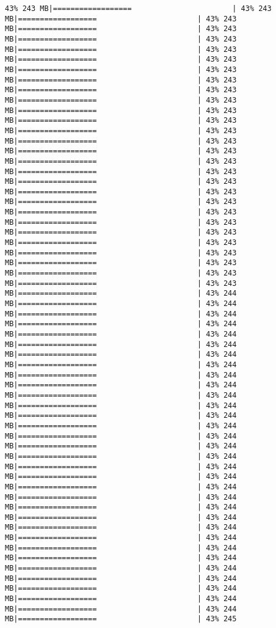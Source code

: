\documentclass[
]{article}
\begin{document}
\begin{verbatim}
43% 243 MB|==================                       | 43% 243 MB|==================                       | 43% 243 MB|==================                       | 43% 243 MB|==================                       | 43% 243 MB|==================                       | 43% 243 MB|==================                       | 43% 243 MB|==================                       | 43% 243 MB|==================                       | 43% 243 MB|==================                       | 43% 243 MB|==================                       | 43% 243 MB|==================                       | 43% 243 MB|==================                       | 43% 243 MB|==================                       | 43% 243 MB|==================                       | 43% 243 MB|==================                       | 43% 243 MB|==================                       | 43% 243 MB|==================                       | 43% 243 MB|==================                       | 43% 243 MB|==================                       | 43% 243 MB|==================                       | 43% 243 MB|==================                       | 43% 243 MB|==================                       | 43% 243 MB|==================                       | 43% 243 MB|==================                       | 43% 243 MB|==================                       | 43% 243 MB|==================                       | 43% 243 MB|==================                       | 43% 243 MB|==================                       | 43% 243 MB|==================                       | 43% 244 MB|==================                       | 43% 244 MB|==================                       | 43% 244 MB|==================                       | 43% 244 MB|==================                       | 43% 244 MB|==================                       | 43% 244 MB|==================                       | 43% 244 MB|==================                       | 43% 244 MB|==================                       | 43% 244 MB|==================                       | 43% 244 MB|==================                       | 43% 244 MB|==================                       | 43% 244 MB|==================                       | 43% 244 MB|==================                       | 43% 244 MB|==================                       | 43% 244 MB|==================                       | 43% 244 MB|==================                       | 43% 244 MB|==================                       | 43% 244 MB|==================                       | 43% 244 MB|==================                       | 43% 244 MB|==================                       | 43% 244 MB|==================                       | 43% 244 MB|==================                       | 43% 244 MB|==================                       | 43% 244 MB|==================                       | 43% 244 MB|==================                       | 43% 244 MB|==================                       | 43% 244 MB|==================                       | 43% 244 MB|==================                       | 43% 244 MB|==================                       | 43% 244 MB|==================                       | 43% 244 MB|==================                       | 43% 244 MB|==================                       | 43% 245 
\end{verbatim}
\end{document}
